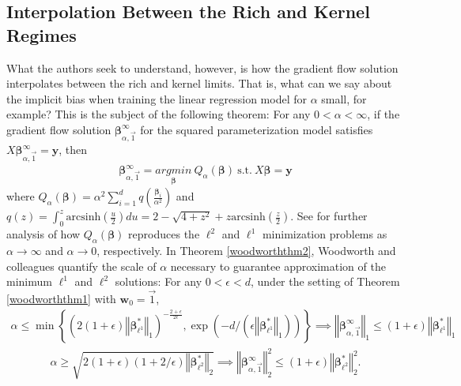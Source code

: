 \documentclass{article}
\newenvironment{manualtheorem}[1]{%
  \renewcommand\themanualtheoreminner{#1}%
  \manualtheoreminner
}{\endmanualtheoreminner}
\begin{document}
\subsection{Interpolation Between the Rich and Kernel Regimes}
What the authors seek to understand, however, is how the gradient flow solution interpolates between the rich and kernel limits. That is, what can we say about the implicit bias when training the linear regression model for $\alpha$ small, for example? This is the subject of the following theorem:
\begin{manualtheorem}{1}\label{woodworththm1}
For any $0 < \alpha < \infty$, if the gradient flow solution $\boldsymbol{\beta}_{\alpha, \vec{1}}^{\infty}$ for the squared parameterization model satisfies $X\boldsymbol{\beta}_{\alpha, \vec{1}}^{\infty} = \boldsymbol{y}$, then 
\begin{align*}
    \boldsymbol{\beta}_{\alpha, \vec{1}}^{\infty} = \underset{\boldsymbol{\beta}}{argmin} \ Q_{\alpha}(\boldsymbol{\beta}) \ \text{s.t.} \ X\boldsymbol{\beta} = \boldsymbol{y}
\end{align*}
where $Q_{\alpha}(\boldsymbol{\beta}) = \alpha^2 \sum_{i=1}^d q\left(\frac{\boldsymbol{\beta}_i}{\alpha^2}\right)$ and $q(z) = \int_0^z \text{arcsinh}\left(\frac{u}{2} \right) du = 2 - \sqrt{4+z^2} + z \text{arcsinh}\left(\frac{z}{2} \right).$
\end{manualtheorem}
See \cite{woodworth2020kernel} for further analysis of how $Q_{\alpha}(\boldsymbol{\beta})$ reproduces the $\ell^2$ and $\ell^1$ minimization problems as $\alpha \rightarrow \infty$ and $\alpha \rightarrow 0$, respectively. In Theorem \ref{woodworththm2}, Woodworth and colleagues quantify the scale of $\alpha$ necessary to guarantee approximation of the minimum $\ell^1$ and $\ell^2$ solutions:
\begin{manualtheorem}{2}\label{woodworththm2}
For any $0 < \epsilon < d$, under the setting of Theorem \ref{woodworththm1} with $\boldsymbol{w}_0 = \vec{1}$, 
\begin{align*}
    \alpha \leq \min \left\{ (2(1 + \epsilon)\left\Vert \boldsymbol{\beta}_{\ell^1}^* \right\Vert_1)^{-\frac{2+ \epsilon}{2\epsilon}}, \exp \left(-d/(\epsilon \left\Vert \boldsymbol{\beta}_{\ell^1}^* \right\Vert_1) \right) \right\} \implies \left\Vert \boldsymbol{\beta}_{\alpha, \vec{1}}^{\infty}\right\Vert_1 \leq (1+\epsilon)\left\Vert \boldsymbol{\beta}_{\ell^1}^* \right\Vert_1
\end{align*}
\begin{align*}
    \alpha \geq \sqrt{2(1+ \epsilon)(1 + 2/\epsilon)\left\Vert \boldsymbol{\beta}_{\ell^2}^* \right\Vert_2} \implies \left\Vert \boldsymbol{\beta}_{\alpha, \vec{1}}^{\infty}\right\Vert_2^2 \leq (1+\epsilon)\left\Vert \boldsymbol{\beta}_{\ell^2}^* \right\Vert_2^2.
\end{align*}
\end{manualtheorem}
\end{document}
